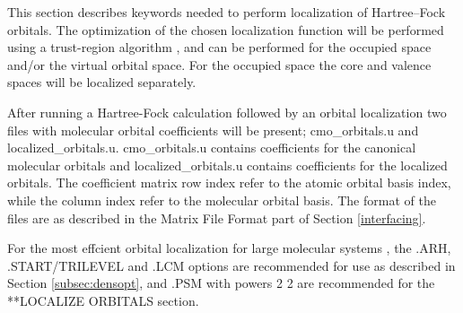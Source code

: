 This section describes keywords needed to perform localization of Hartree--Fock orbitals. The optimization of the
chosen localization function will be performed using a trust-region algorithm \cite{hoyvik:TRM}, and can be performed for  the occupied space and/or the virtual orbital space. For the occupied space the core and valence spaces will be localized separately.  

After running a Hartree-Fock calculation followed by an orbital localization two files with molecular orbital coefficients will be present; cmo\_orbitals.u and localized\_orbitals.u. cmo\_orbitals.u contains coefficients for the canonical molecular orbitals and localized\_orbitals.u contains coefficients for the localized orbitals. The coefficient matrix row index refer to the atomic orbital basis index, while the column index refer to the molecular orbital basis. The format of the files are as described in the Matrix File Format part of Section \ref{interfacing}.  

For the most effcient orbital localization for large molecular systems \cite{hoyvik:3L}, the .ARH, .START/TRILEVEL  and .LCM options are recommended for use as described in Section \ref{subsec:densopt}, and .PSM with powers 2 2 are recommended for the **LOCALIZE ORBITALS section.  

